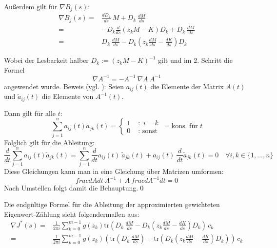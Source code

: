 \documentclass[a4paper,12pt]{report}
\newcommand{\klammer}[1]{\left(#1\right)}
\newcommand{\tr}{\text{tr}}
\newcommand{\inv}{^{-1}}
\newcommand{\1}{\mathds{1}}
\theoremstyle{plain} %
\theoremstyle{definition} %
\theoremstyle{remark}
\begin{document}
            Außerdem gilt für $\nabla B_j(s)$:
            \begin{align*}
                  \nabla B_j(s) =& \frac{dD_k}{ds} \ M + D_k \ \frac{dM}{ds}\\
                  =& - D_k \frac{d}{ds}(z_kM-K) D_k + D_k \ \frac{dM}{ds}\\
                  =& D_k \ \frac{dM}{ds} - D_k \klammer{z_k \frac{dM}{ds}-\frac{dK}{ds}} D_k
            \end{align*}

            Wobei der Lesbarkeit halber $D_k:=(z_kM-K)\inv$ gilt und im 2. Schritt die Formel
            $$\nabla A\inv = -A\inv\ \nabla A\ A\inv$$
            angewendet wurde.
            Beweis (vgl. \cite{derivativeInverseMatrix}):
            Seien $a_{ij}(t)$ die Elemente der Matrix $A(t)$ und $\widetilde{a}_{ij}(t)$ die Elemente von $A\inv(t)$.

            Dann gilt für alle $t$:
            $$\sum_{j=1}^{n} a_{ij}(t)\widetilde{a}_{jk}(t) =  \begin{cases}
                        1 & \text{ :  }\, i=k \\
                        0 & \text{ :  sonst } 
                        \end{cases} = \text{kons. für }t $$
            Folglich gilt für die Ableitung:
            $$\frac{d}{dt}\sum_{j=1}^{n} a_{ij}(t)\widetilde{a}_{jk}(t) = \sum_{j=1}^{n} \frac{d}{dt}a_{ij}(t)\ \widetilde{a}_{jk}(t)+a_{ij}(t)\ \frac{d}{dt}\widetilde{a}_{jk}(t) = 0 \quad \forall i,k\in\{1,\dots,n\}$$
            Diese Gleichungen kann man in eine Gleichung über Matrizen umformen:
            $$frac{dA}{dt}\ A\inv + A\ frac{dA\inv}{dt} = 0$$
            Nach Umstellen folgt damit die Behauptung.\qed

            Die endgültige Formel für die Ableitung der approximierten gewichteten Eigenwert-Zählung sieht folgendermaßen aus:
            \begin{align}
                  \label{eqn: vollständigeZielfunktion}
                  \nabla J^*(s) =& \frac 1 {2\pi i}\sum_{k=0}^{m-1} g(z_k) \tr\klammer{D_k \ \frac{dM}{ds} - D_k \klammer{z_k \frac{dM}{ds}-\frac{dK}{ds}} D_k}\,c_k\\
                  =& \frac 1 {2\pi i}\sum_{k=0}^{m-1} g(z_k) \klammer{\tr\klammer{D_k \ \frac{dM}{ds}} - \tr\klammer{D_k \klammer{z_k \frac{dM}{ds}-\frac{dK}{ds}} D_k}}\,c_k
            \end{align}
            
\end{document}
